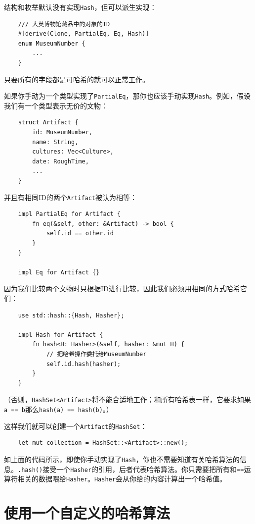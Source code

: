 结构和枚举默认没有实现\texttt{Hash}，但可以派生实现：
\begin{verbatim}
    /// 大英博物馆藏品中的对象的ID
    #[derive(Clone, PartialEq, Eq, Hash)]
    enum MuseumNumber {
        ...
    }
\end{verbatim}
只要所有的字段都是可哈希的就可以正常工作。

如果你手动为一个类型实现了\texttt{PartialEq}，那你也应该手动实现\texttt{Hash}。例如，假设我们有一个类型表示无价的文物：
\begin{verbatim}
    struct Artifact {
        id: MuseumNumber,
        name: String,
        cultures: Vec<Culture>,
        date: RoughTime,
        ...
    }
\end{verbatim}

并且有相同ID的两个\texttt{Artifact}被认为相等：
\begin{verbatim}
    impl PartialEq for Artifact {
        fn eq(&self, other: &Artifact) -> bool {
            self.id == other.id
        }
    }

    impl Eq for Artifact {}
\end{verbatim}

因为我们比较两个文物时只根据ID进行比较，因此我们必须用相同的方式哈希它们：
\begin{verbatim}
    use std::hash::{Hash, Hasher};

    impl Hash for Artifact {
        fn hash<H: Hasher>(&self, hasher: &mut H) {
            // 把哈希操作委托给MuseumNumber
            self.id.hash(hasher);
        }
    }
\end{verbatim}
（否则，\texttt{HashSet<Artifact>}将不能合适地工作；和所有哈希表一样，它要求如果\texttt{a == b}那么\texttt{hash(a) == hash(b)}。）

这样我们就可以创建一个\texttt{Artifact}的\texttt{HashSet}：
\begin{verbatim}
    let mut collection = HashSet::<Artifact>::new();
\end{verbatim}

如上面的代码所示，即使你手动实现了\texttt{Hash}，你也不需要知道有关哈希算法的信息。\texttt{.hash()}接受一个\texttt{Hasher}的引用，后者代表哈希算法。你只需要把所有和\texttt{==}运算符相关的数据喂给\texttt{Hasher}。\texttt{Hasher}会从你给的内容计算出一个哈希值。

\section{使用一个自定义的哈希算法}

